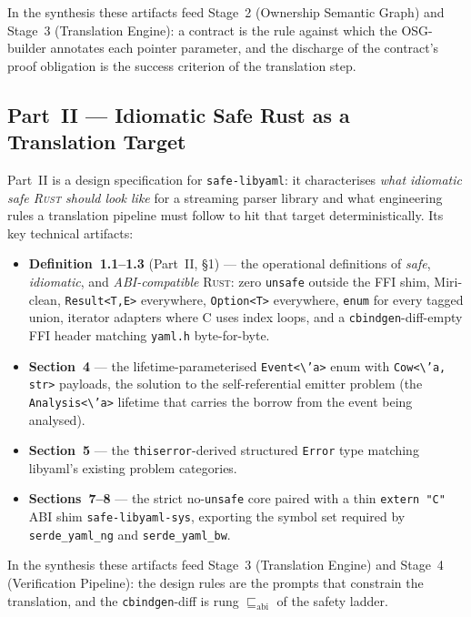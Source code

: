 \documentclass[12pt]{article}
\theoremstyle{definition}
\theoremstyle{remark}
\newcommand{\rust}{\textnormal{\textsc{Rust}}}
\newcommand{\safelibyaml}{\texttt{safe-libyaml}}
\newcommand{\ABI}{\ensuremath{\sqsubseteq_{\!\mathrm{abi}}}}
\begin{document}
In the synthesis these artifacts feed Stage~2 (Ownership Semantic
Graph) and Stage~3 (Translation Engine): a contract is the rule against
which the OSG-builder annotates each pointer parameter, and the
discharge of the contract's proof obligation is the success criterion of
the translation step.

\subsection{Part~II --- Idiomatic Safe Rust as a Translation Target}

Part~II is a design specification for \safelibyaml{}: it characterises
\emph{what idiomatic safe \rust{} should look like} for a streaming
parser library and what engineering rules a translation pipeline must
follow to hit that target deterministically. Its key technical artifacts:

\begin{itemize}
\item \textbf{Definition~1.1--1.3} (Part~II, \S{}1) --- the
operational definitions of \emph{safe}, \emph{idiomatic}, and
\emph{ABI-compatible} \rust{}: zero \texttt{unsafe} outside the FFI
shim, Miri-clean, \texttt{Result<T,E>} everywhere, \texttt{Option<T>}
everywhere, \texttt{enum} for every tagged union, iterator adapters
where C uses index loops, and a \texttt{cbindgen}-diff-empty FFI header
matching \texttt{yaml.h} byte-for-byte.
\item \textbf{Section~4} --- the lifetime-parameterised
\texttt{Event<\textbackslash 'a>} enum with \texttt{Cow<\textbackslash 'a, str>} payloads, the
solution to the self-referential emitter problem (the
\texttt{Analysis<\textbackslash 'a>} lifetime that carries the
borrow from the event being analysed).
\item \textbf{Section~5} --- the \texttt{thiserror}-derived
structured \texttt{Error} type matching libyaml's existing problem
categories.
\item \textbf{Sections~7--8} --- the strict no-\texttt{unsafe} core
paired with a thin \texttt{extern "C"} ABI shim
\texttt{safe-libyaml-sys}, exporting the symbol set required by
\texttt{serde\_yaml\_ng} and \texttt{serde\_yaml\_bw}.
\end{itemize}

In the synthesis these artifacts feed Stage~3 (Translation Engine) and
Stage~4 (Verification Pipeline): the design rules are the prompts that
constrain the translation, and the \texttt{cbindgen}-diff is rung
\(\ABI\) of the safety ladder.
\end{document}
